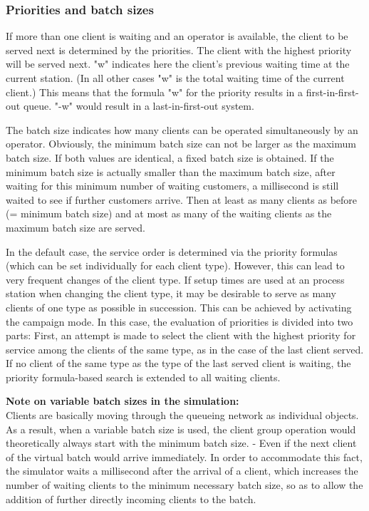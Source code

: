 \subsubsection*{Priorities and batch sizes}

If more than one client is waiting and an operator is available, the client to be served next is determined by the 
priorities. The client with the highest priority will be served next. 
"w" indicates here the client's previous waiting time at the current station. (In all other cases "w" is the total
waiting time of the current client.) This means that the formula "w" for the priority results
in a first-in-first-out queue. "-w" would result in a last-in-first-out system.

The batch size indicates how many clients can be operated simultaneously by an operator. Obviously, the minimum batch
size can not be larger as the maximum batch size. If both values are identical, a fixed batch size is obtained.
If the minimum batch size is actually smaller than the maximum batch size, after waiting for this minimum number of
waiting customers, a millisecond is still waited to see if further customers arrive. Then at least as many clients
as before (= minimum batch size) and at most as many of the waiting clients as the maximum batch size are served.

In the default case, the service order is determined via the priority formulas (which can be set individually for each client type).
However, this can lead to very frequent changes of the client type. If setup times are used at an process station when changing the
client type, it may be desirable to serve as many clients of one type as possible in succession. This can be achieved by activating
the campaign mode. In this case, the evaluation of priorities is divided into two parts: First, an attempt is made to select the
client with the highest priority for service among the clients of the same type, as in the case of the last client served.
If no client of the same type as the type of the last served client is waiting, the priority formula-based search is extended
to all waiting clients.

\textbf{Note on variable batch sizes in the simulation:}~\\
Clients are basically moving through the queueing network as individual objects.
As a result, when a variable batch size is used, the client group operation would theoretically always
start with the minimum batch size. - Even if the next client of the virtual batch would arrive immediately.
In order to accommodate this fact, the simulator waits a millisecond after the arrival of a client, which
increases the number of waiting clients to the minimum necessary batch size, so as to allow the addition
of further directly incoming clients to the batch.

